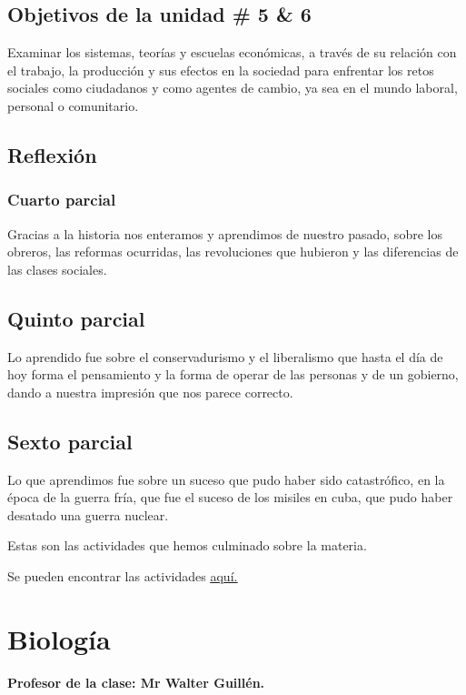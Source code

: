 \documentclass[a4paper, 12pt]{article}
\begin{document}
\subsection{Objetivos de la unidad \# 5 \& 6}

Examinar los sistemas, teorías y escuelas económicas, a través de su relación con el trabajo, la producción y sus efectos en la sociedad para enfrentar los retos sociales como ciudadanos y como agentes de cambio, ya sea en el mundo laboral, personal o comunitario.

\subsection{Reflexión}

\subsubsection{Cuarto parcial}
Gracias a la historia nos enteramos y aprendimos de nuestro pasado, sobre los obreros, las reformas ocurridas, las revoluciones que hubieron y las diferencias de las clases sociales.

\subsection{Quinto parcial}
Lo aprendido fue sobre el conservadurismo y el liberalismo que hasta el día de hoy forma el pensamiento y la forma de operar de las personas y de un gobierno, dando a nuestra impresión que nos parece correcto.

\subsection{Sexto parcial}
Lo que aprendimos fue sobre un suceso que pudo haber sido catastrófico, en la época de la guerra fría, que fue el suceso de los misiles en cuba, que pudo haber desatado una guerra nuclear.

Estas son las actividades que hemos culminado sobre la materia.

Se pueden encontrar las actividades \href{https://drive.google.com/drive/folders/1J-HMvcP6JzfQoPtuu-0Y0o9HO8xSQonl?usp=sharing}{\underline{aquí.}}

\section{Biología}
\textbf{Profesor de la clase: Mr Walter Guillén.}
\end{document}
